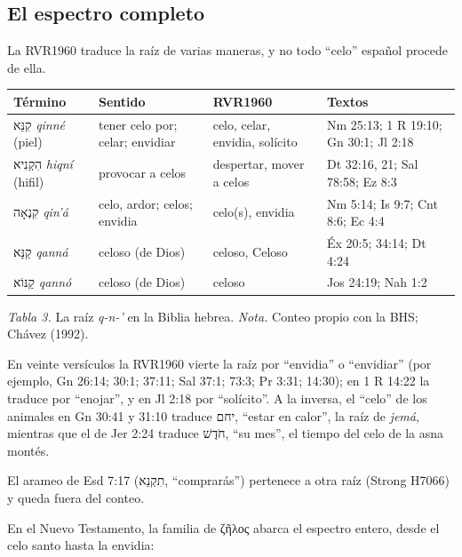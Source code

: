 \documentclass[11pt,letterpaper]{article}
\newcommand{\heb}[1]{\mbox{\foreignlanguage{hebrew}{#1}}}
\newcommand{\grc}[1]{\foreignlanguage{ancientgreek}{#1}}
\begin{document}
\subsection{El espectro completo}
La RVR1960 traduce la raíz de varias maneras, y no todo ``celo'' español procede de ella.

\begin{center}\small\renewcommand{\arraystretch}{1.15}
\begin{tabular}{@{}L{3.2cm}L{3.6cm}L{3.0cm}L{4.0cm}@{}}
\toprule
\textbf{Término} & \textbf{Sentido} & \textbf{RVR1960} & \textbf{Textos} \\ \midrule
\heb{קִנֵּא} \emph{qinné} (piel) & tener celo por; celar; envidiar & celo, celar, envidia, solícito & Nm 25:13; 1 R 19:10; Gn 30:1; Jl 2:18 \\
\heb{הִקְנִיא} \emph{hiqní} (hifil) & provocar a celos & despertar, mover a celos & Dt 32:16, 21; Sal 78:58; Ez 8:3 \\
\heb{קִנְאָה} \emph{qin'á} & celo, ardor; celos; envidia & celo(s), envidia & Nm 5:14; Is 9:7; Cnt 8:6; Ec 4:4 \\
\heb{קַנָּא} \emph{qanná} & celoso (de Dios) & celoso, Celoso & Éx 20:5; 34:14; Dt 4:24 \\
\heb{קַנּוֹא} \emph{qannó} & celoso (de Dios) & celoso & Jos 24:19; Nah 1:2 \\
\bottomrule
\end{tabular}\par
{\footnotesize\color{gris}\textit{Tabla 3.} La raíz \emph{q-n-'} en la Biblia hebrea. \textit{Nota.} Conteo propio con la BHS; Chávez (1992).}
\end{center}

En veinte versículos la RVR1960 vierte la raíz por ``envidia'' o ``envidiar'' (por ejemplo, Gn 26:14; 30:1; 37:11; Sal 37:1; 73:3; Pr 3:31; 14:30); en 1 R 14:22 la traduce por ``enojar'', y en Jl 2:18 por ``solícito''. A la inversa, el ``celo'' de los animales en Gn 30:41 y 31:10 traduce \heb{יחם}, ``estar en calor'', la raíz de \emph{jemá}, mientras que el de Jer 2:24 traduce \heb{חֹדֶשׁ}, ``su mes'', el tiempo del celo de la asna montés.

\begin{nota}[Precisión]
El arameo de Esd 7:17 (\heb{תִקְנֵא}, ``comprarás'') pertenece a otra raíz (Strong H7066) y queda fuera del conteo.
\end{nota}

En el Nuevo Testamento, la familia de \grc{ζῆλος} abarca el espectro entero, desde el celo santo hasta la envidia:
\end{document}
